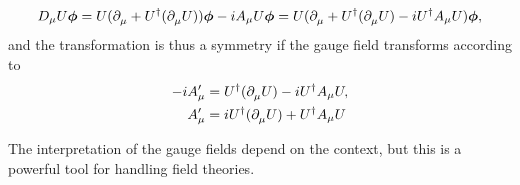 \begin{align*}
	D_{\mu}U\vb*{\phi} = U(\partial^{}_{\mu} + U^{\dagger}(\partial^{}_{\mu}U))\vb*{\phi} - iA_{\mu}U\vb*{\phi} = U(\partial^{}_{\mu} + U^{\dagger}(\partial^{}_{\mu}U) - iU^{\dagger}A_{\mu}U)\vb*{\phi},
\end{align*}
and the transformation is thus a symmetry if the gauge field transforms according to
\begin{align*}
	-iA^{\prime}_{\mu} &= U^{\dagger}(\partial^{}_{\mu}U) - iU^{\dagger}A_{\mu}U, \\
	A^{\prime}_{\mu}   &= iU^{\dagger}(\partial^{}_{\mu}U)  + U^{\dagger}A_{\mu}U
\end{align*}

The interpretation of the gauge fields depend on the context, but this is a powerful tool for handling field theories.